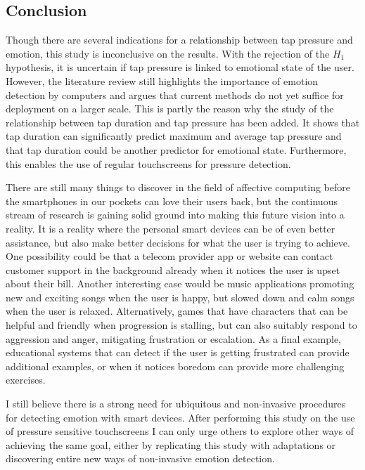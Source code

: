 \documentclass{sigchi}
\begin{document}
\subsection{Conclusion} %
\label{sub:conclusion}
Though there are several indications for a relationship between tap pressure and emotion, this study is inconclusive on the results. With the rejection of the $H_1$ hypothesis, it is uncertain if tap pressure is linked to emotional state of the user. However, the literature review still highlights the importance of emotion detection by computers and argues that current methods do not yet suffice for deployment on a larger scale. This is partly the reason why the study of the relationship between tap duration and tap pressure has been added. It shows that tap duration can significantly predict maximum and average tap pressure and that tap duration could be another predictor for emotional state. Furthermore, this enables the use of regular touchscreens for pressure detection.

There are still many things to discover in the field of affective computing before the smartphones in our pockets can love their users back, but the continuous stream of research is gaining solid ground into making this future vision into a reality. It is a reality where the personal smart devices can be of even better assistance, but also make better decisions for what the user is trying to achieve. One possibility could be that a telecom provider app or website can contact customer support in the background already when it notices the user is upset about their bill. Another interesting case would be music applications promoting new and exciting songs when the user is happy, but slowed down and calm songs when the user is relaxed. Alternatively, games that have characters that can be helpful and friendly when progression is stalling, but can also suitably respond to aggression and anger, mitigating frustration or escalation. As a final example, educational systems that can detect if the user is getting frustrated can provide additional examples, or when it notices boredom can provide more challenging exercises.

I still believe there is a strong need for ubiquitous and non-invasive procedures for detecting emotion with smart devices. After performing this study on the use of pressure sensitive touchscreens I can only urge others to explore other ways of achieving the same goal, either by replicating this study with adaptations or discovering entire new ways of non-invasive emotion detection.
\end{document}
